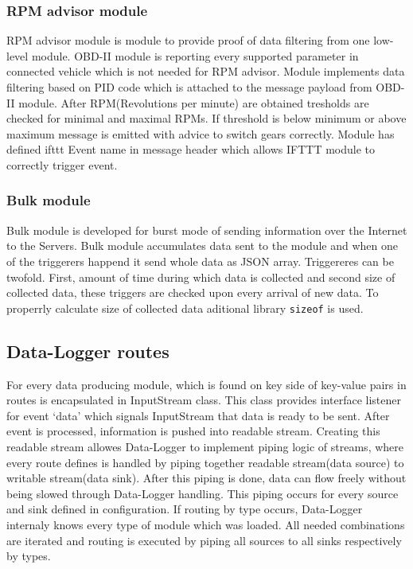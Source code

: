 \subsubsection{RPM advisor module} %
\label{ssub:rpm_advisor_module}
RPM advisor module is module to provide proof of data filtering from one low-level module. OBD-II module is reporting every supported parameter in connected vehicle which is not needed for RPM advisor. Module implements data filtering based on PID code which is attached to the message payload from OBD-II module. After RPM(Revolutions per minute) are obtained tresholds are checked for minimal and maximal RPMs. If threshold is below minimum or above maximum message is emitted with advice to switch gears correctly. Module has defined ifttt Event name in message header which allows IFTTT module to correctly trigger event.

\subsubsection{Bulk module} %
\label{ssub:bulk_module}
Bulk module is developed for burst mode of sending information over the Internet to the Servers. Bulk module accumulates data sent to the module and when one of the triggerers happend it send whole data as JSON array. Triggereres can be twofold. First, amount of time during which data is collected and second size of collected data, these triggers are checked upon every arrival of new data. To properrly calculate size of collected data aditional library \verb|sizeof| is used.
\subsection{Data-Logger routes} %
\label{sub:data_logger_routes}
For every data producing module, which is found on key side of key-value pairs in routes is encapsulated in InputStream class. This class provides interface listener for event `data' which signals InputStream that data is ready to be sent. After event is processed, information is pushed into readable stream. Creating this readable stream allowes Data-Logger to implement piping logic of streams, where every route defines is handled by piping together readable stream(data source) to writable stream(data sink). After this piping is done, data can flow freely without being slowed through Data-Logger handling. This piping occurs for every source and sink defined in configuration. If routing by type occurs, Data-Logger internaly knows every type of module which was loaded. All needed combinations are iterated and routing is executed by piping all sources to all sinks respectively by types.
